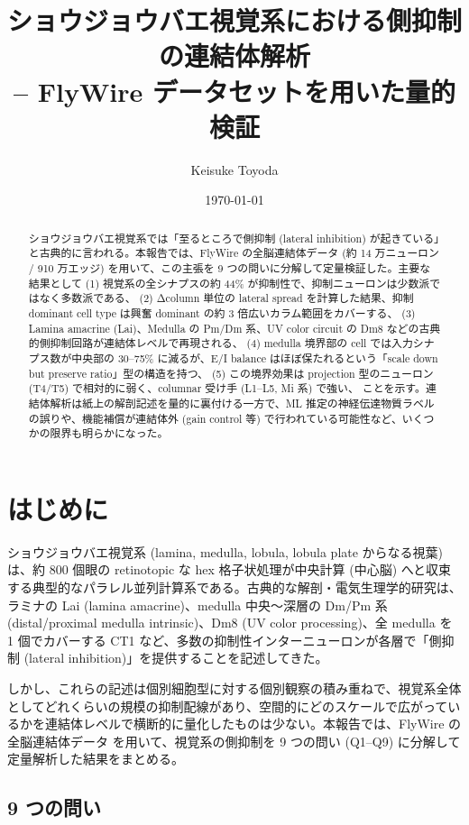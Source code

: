\documentclass[11pt,a4paper]{ltjsarticle}
\title{ショウジョウバエ視覚系における側抑制の連結体解析\\
\large -- FlyWire データセットを用いた量的検証}
\author{Keisuke Toyoda}
\date{\today}
\begin{document}
\maketitle

\begin{abstract}
ショウジョウバエ視覚系では「至るところで側抑制 (lateral inhibition) が起きている」と古典的に言われる。本報告では、FlyWire の全脳連結体データ (約 14 万ニューロン / 910 万エッジ) を用いて、この主張を 9 つの問いに分解して定量検証した。主要な結果として
(1) 視覚系の全シナプスの約 44\% が抑制性で、抑制ニューロンは少数派ではなく多数派である、
(2) Δcolumn 単位の lateral spread を計算した結果、抑制 dominant cell type は興奮 dominant の約 3 倍広いカラム範囲をカバーする、
(3) Lamina amacrine (Lai)、Medulla の Pm/Dm 系、UV color circuit の Dm8 などの古典的側抑制回路が連結体レベルで再現される、
(4) medulla 境界部の cell では入力シナプス数が中央部の 30–75\% に減るが、E/I balance はほぼ保たれるという「scale down but preserve ratio」型の構造を持つ、
(5) この境界効果は projection 型のニューロン (T4/T5) で相対的に弱く、columnar 受け手 (L1--L5, Mi 系) で強い、
ことを示す。連結体解析は紙上の解剖記述を量的に裏付ける一方で、ML 推定の神経伝達物質ラベルの誤りや、機能補償が連結体外 (gain control 等) で行われている可能性など、いくつかの限界も明らかになった。
\end{abstract}

\section{はじめに}\label{sec:intro}

ショウジョウバエ視覚系 (lamina, medulla, lobula, lobula plate からなる視葉) は、約 800 個眼の retinotopic な hex 格子状処理が中央計算 (中心脳) へと収束する典型的なパラレル並列計算系である。古典的な解剖・電気生理学的研究は、ラミナの Lai (lamina amacrine)、medulla 中央〜深層の Dm/Pm 系 (distal/proximal medulla intrinsic)、Dm8 (UV color processing)、全 medulla を 1 個でカバーする CT1 など、多数の抑制性インターニューロンが各層で「側抑制 (lateral inhibition)」を提供することを記述してきた。

しかし、これらの記述は個別細胞型に対する個別観察の積み重ねで、視覚系全体としてどれくらいの規模の抑制配線があり、空間的にどのスケールで広がっているかを連結体レベルで横断的に量化したものは少ない。本報告では、FlyWire の全脳連結体データ \cite{flywire2024} を用いて、視覚系の側抑制を 9 つの問い (Q1--Q9) に分解して定量解析した結果をまとめる。

\subsection*{9 つの問い}
\end{document}
